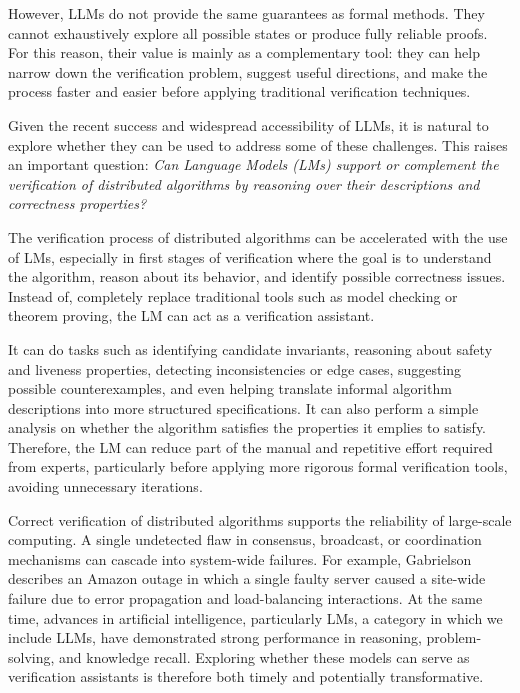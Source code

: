 However, LLMs do not provide the same guarantees as formal methods. They cannot exhaustively explore all possible states or produce fully reliable proofs. For this reason, their value is mainly as a complementary tool: they can help narrow down the verification problem, suggest useful directions, and make the process faster and easier before applying traditional verification techniques.

Given the recent success and widespread accessibility of LLMs, it is natural to explore whether they can be used to address some of these challenges. This raises an important question: \textit{Can Language Models (LMs) support or complement the verification of distributed algorithms by reasoning over their descriptions and correctness properties?}

The verification process of distributed algorithms can be accelerated with the use of LMs, especially in first stages of verification where the goal is to understand the algorithm, reason about its behavior, and identify possible correctness issues. Instead of, completely replace traditional tools such as model checking or theorem proving, the LM can act as a verification assistant.

It can do tasks such as identifying candidate invariants, reasoning about safety and liveness properties, detecting inconsistencies or edge cases, suggesting possible counterexamples, and even helping translate informal algorithm descriptions into more structured specifications. It can also perform a simple analysis on whether the algorithm satisfies the properties it emplies to satisfy. Therefore, the LM can reduce part of the manual and repetitive effort required from experts, particularly before applying more rigorous formal verification tools, avoiding unnecessary iterations.

Correct verification of distributed algorithms supports the reliability of large-scale computing. A single undetected flaw in consensus, broadcast, or coordination mechanisms can cascade into system-wide failures. For example, Gabrielson describes an Amazon outage in which a single faulty server caused a site-wide failure due to error propagation and load-balancing interactions\cite{gabrielson_distributed_challenges}. At the same time, advances in artificial intelligence, particularly LMs, a category in which we include LLMs, have demonstrated strong performance in reasoning\cite{wei2022cot}, problem-solving, and knowledge recall. Exploring whether these models can serve as verification assistants is therefore both timely and potentially transformative.


